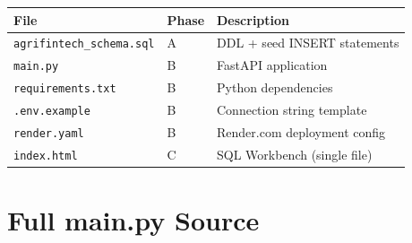 \documentclass[12pt, a4paper]{article}
\begin{document}
\begin{center}
\begin{tabularx}{\linewidth}{llX}
  \toprule
  \textbf{File}                   & \textbf{Phase} & \textbf{Description} \\
  \midrule
  \texttt{agrifintech\_schema.sql} & A      & DDL + seed INSERT statements \\
  \texttt{main.py}                 & B      & FastAPI application \\
  \texttt{requirements.txt}        & B      & Python dependencies \\
  \texttt{.env.example}            & B      & Connection string template \\
  \texttt{render.yaml}             & B      & Render.com deployment config \\
  \texttt{index.html}              & C      & SQL Workbench (single file) \\
  \bottomrule
\end{tabularx}
\end{center}

\section{Full main.py Source}
\end{document}
